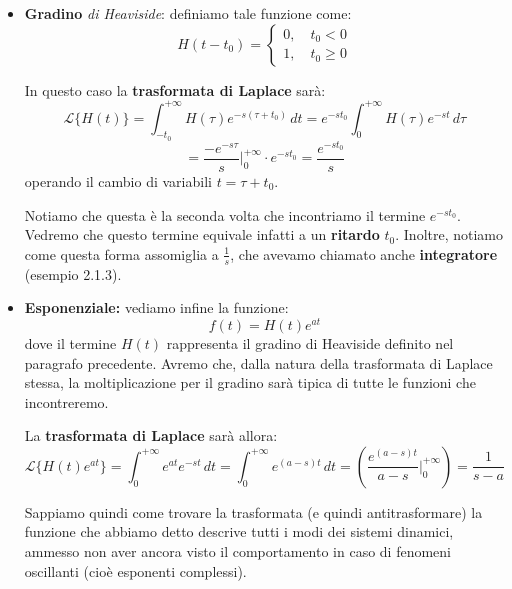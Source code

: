\documentclass[a4paper,11pt]{article}
\begin{document}
\begin{itemize}
	\item \textbf{Gradino}  \textit{di Heaviside}: definiamo tale funzione come:
		$$
			H(t - t_0) = 
				\begin{cases}
					0, \quad t_0 < 0 \\
					1, \quad t_0 \geq 0
				\end{cases}
		$$
		
		In questo caso la \textbf{trasformata di Laplace} sarà: 
		$$
		\mathcal{L}\{H(t)\} = \int_{-t_0}^{+\infty} H(\tau) e^{-s(\tau + t_0)} \, dt = e^{-s t_0} \int_0^{+ \infty} H(\tau)e^{-st} \, d\tau 
		$$
		$$
		= \frac{-e^{-s\tau}}{s} \Bigg|^{+\infty}_0 \cdot e^{-s t_0} = \frac{e^{-s t_0}}{s}
		$$
		operando il cambio di variabili $t = \tau + t_0$.

		Notiamo che questa è la seconda volta che incontriamo il termine $e^{-s t_0}$. Vedremo che questo termine equivale infatti a un \textbf{ritardo} $t_0$.
		Inoltre, notiamo come questa forma assomiglia a $\frac{1}{s}$, che avevamo chiamato anche \textbf{integratore} (esempio 2.1.3).

	\item \textbf{Esponenziale:} vediamo infine la funzione:
		$$
		f(t) = H(t) e^{at}
		$$
		dove il termine $H(t)$ rappresenta il gradino di Heaviside definito nel paragrafo precedente.
		Avremo che, dalla natura della trasformata di Laplace stessa, la moltiplicazione per il gradino sarà tipica di tutte le funzioni che incontreremo.
		
		La \textbf{trasformata di Laplace} sarà allora:
		$$
		\mathcal{L} \{ H(t) e^{at} \} = \int_0^{+ \infty} e^{at} e^{-st} \, dt = \int_0^{+\infty} e^{(a - s)t} \, dt = \left( \frac{e^{(a - s)t}}{a - s} \Bigg|^{+\infty}_0 \right) = \frac{1}{s - a}
		$$

		Sappiamo quindi come trovare la trasformata (e quindi antitrasformare) la funzione che abbiamo detto descrive tutti i modi dei sistemi dinamici, ammesso non aver ancora visto il comportamento in caso di fenomeni oscillanti (cioè esponenti complessi).
\end{itemize}
\end{document}
